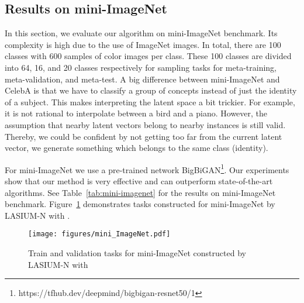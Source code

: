 \documentclass{article}
\begin{document}
 \subsection{Results on mini-ImageNet}

In this section, we evaluate our algorithm on mini-ImageNet benchmark.
Its complexity is high due to the use of ImageNet images. In total, there are 100 classes with 600 samples of  color images per class. These 100 classes are divided into 64, 16, and 20 classes respectively for sampling tasks for meta-training, meta-validation, and meta-test.
A big difference between mini-ImageNet and CelebA is that we have to classify a group of concepts instead of just the identity of a subject. This makes interpreting the latent space a bit trickier. For example, it is not rational to interpolate between a bird and a piano. However, the assumption that nearby latent vectors belong to nearby instances is still valid. Thereby, we could be confident by not getting too far from the current latent vector, we generate something which belongs to the same class (identity). 


For mini-ImageNet we use a pre-trained network BigBiGAN\footnote{https://tfhub.dev/deepmind/bigbigan-resnet50/1}. Our experiments show that our method is very effective and can outperform state-of-the-art algorithms. See Table~\ref{tab:mini-imagenet} for the results on mini-ImageNet benchmark.
Figure~\ref{fig:miniImageNet} demonstrates tasks constructed for mini-ImageNet by LASIUM-N with .


\begin{figure}[ht]
    \centering
    \texttt{[image: figures/mini\_ImageNet.pdf]}
    \caption{Train and validation tasks for mini-ImageNet constructed by LASIUM-N with }
    \label{fig:miniImageNet}
\end{figure}
\end{document}
